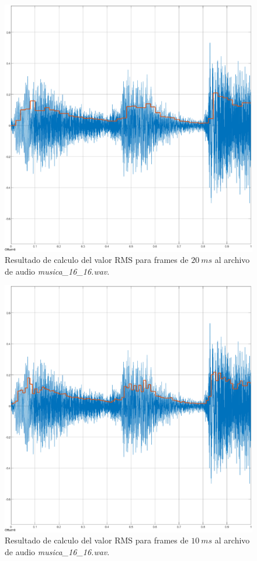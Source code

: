 \begin{figure}[H]
    \centering
    \includegraphics[scale = 0.4]{Figuras/p4_1_envolvente_frame.eps}
    \caption{Resultado de calculo del valor RMS para frames de $20~ms$ al archivo de audio \textit{musica\_16\_16.wav}.}
    \label{envolve}
\end{figure}


\begin{figure}[H]
    \centering
    \includegraphics[scale = 0.4]{Figuras/rms_10ms.eps}
    \caption{Resultado de calculo del valor RMS para frames de $10~ms$ al archivo de audio \textit{musica\_16\_16.wav}.}
    \label{envolve10ms}
\end{figure}

